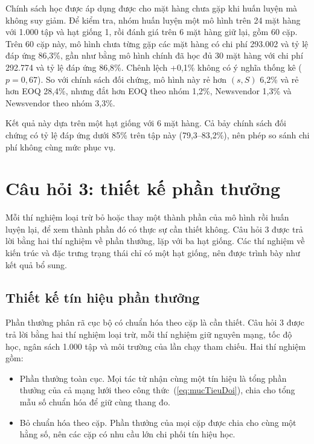 Chính sách học được áp dụng được cho mặt hàng chưa gặp khi huấn luyện mà không suy giảm. Để kiểm tra, nhóm huấn luyện một mô hình trên 24 mặt hàng với 1.000 tập và hạt giống 1, rồi đánh giá trên 6 mặt hàng giữ lại, gồm 60 cặp. Trên 60 cặp này, mô hình chưa từng gặp các mặt hàng có chi phí 293.002 và tỷ lệ đáp ứng 86,3\%, gần như bằng mô hình chính đã học đủ 30 mặt hàng với chi phí 292.774 và tỷ lệ đáp ứng 86,8\%. Chênh lệch +0,1\% không có ý nghĩa thống kê ($p = 0{,}67$). So với chính sách đối chứng, mô hình này rẻ hơn $(s, S)$ 6,2\% và rẻ hơn EOQ 28,4\%, nhưng đắt hơn EOQ theo nhóm 1,2\%, Newsvendor 1,3\% và Newsvendor theo nhóm 3,3\%.

Kết quả này dựa trên một hạt giống với 6 mặt hàng. Cả bảy chính sách đối chứng có tỷ lệ đáp ứng dưới 85\% trên tập này (79,3--83,2\%), nên phép so sánh chi phí không cùng mức phục vụ.

\section{Câu hỏi 3: thiết kế phần thưởng}
\label{sec:cau3}

Mỗi thí nghiệm loại trừ bỏ hoặc thay một thành phần của mô hình rồi huấn luyện lại, để xem thành phần đó có thực sự cần thiết không. Câu hỏi 3 được trả lời bằng hai thí nghiệm về phần thưởng, lặp với ba hạt giống. Các thí nghiệm về kiến trúc và đặc trưng trạng thái chỉ có một hạt giống, nên được trình bày như kết quả bổ sung.

\subsection{Thiết kế tín hiệu phần thưởng}
\label{subsec:ablationReward}

Phần thưởng phân rã cục bộ có chuẩn hóa theo cặp là cần thiết. Câu hỏi 3 được trả lời bằng hai thí nghiệm loại trừ, mỗi thí nghiệm giữ nguyên mạng, tốc độ học, ngân sách 1.000 tập và môi trường của lần chạy tham chiếu. Hai thí nghiệm gồm:
\begin{itemize}
    \item Phần thưởng toàn cục. Mọi tác tử nhận cùng một tín hiệu là tổng phần thưởng của cả mạng lưới theo công thức~(\ref{eq:mucTieuDoi}), chia cho tổng mẫu số chuẩn hóa để giữ cùng thang đo.
    \item Bỏ chuẩn hóa theo cặp. Phần thưởng của mọi cặp được chia cho cùng một hằng số, nên các cặp có nhu cầu lớn chi phối tín hiệu học.
\end{itemize}

